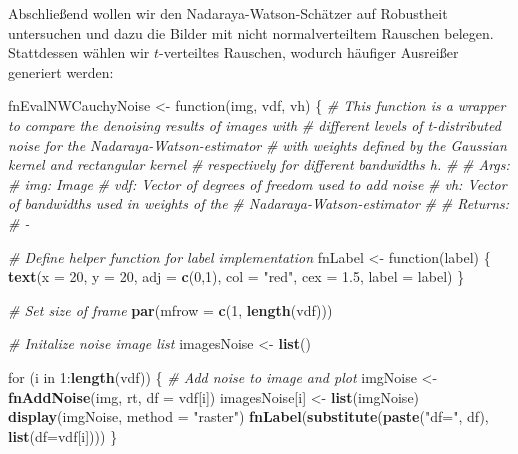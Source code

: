 \documentclass[10pt,]{article}
\newenvironment{Shaded}{\begin{snugshade}}{\end{snugshade}}
\newcommand{\KeywordTok}[1]{\textcolor[rgb]{0.13,0.29,0.53}{\textbf{{#1}}}}
\newcommand{\DataTypeTok}[1]{\textcolor[rgb]{0.13,0.29,0.53}{{#1}}}
\newcommand{\DecValTok}[1]{\textcolor[rgb]{0.00,0.00,0.81}{{#1}}}
\newcommand{\FloatTok}[1]{\textcolor[rgb]{0.00,0.00,0.81}{{#1}}}
\newcommand{\StringTok}[1]{\textcolor[rgb]{0.31,0.60,0.02}{{#1}}}
\newcommand{\CommentTok}[1]{\textcolor[rgb]{0.56,0.35,0.01}{\textit{{#1}}}}
\newcommand{\NormalTok}[1]{{#1}}
\begin{document}
Abschließend wollen wir den Nadaraya-Watson-Schätzer auf Robustheit
untersuchen und dazu die Bilder mit nicht normalverteiltem Rauschen
belegen. Stattdessen wählen wir \(t\)-verteiltes Rauschen, wodurch
häufiger Ausreißer generiert werden:

\begin{Shaded}
\begin{Highlighting}[]
\NormalTok{fnEvalNWCauchyNoise <-}\StringTok{ }\NormalTok{function(img, vdf, vh) \{}
  \CommentTok{# This function is a wrapper to compare the denoising results of images with }
  \CommentTok{# different levels of t-distributed noise for the Nadaraya-Watson-estimator }
  \CommentTok{# with weights defined by the Gaussian kernel and rectangular kernel}
  \CommentTok{# respectively for different bandwidths h.}
  \CommentTok{# }
  \CommentTok{# Args:}
  \CommentTok{#   img:  Image}
  \CommentTok{#   vdf:  Vector of degrees of freedom used to add noise}
  \CommentTok{#   vh:   Vector of bandwidths used in weights of the}
  \CommentTok{#         Nadaraya-Watson-estimator}
  \CommentTok{#   }
  \CommentTok{# Returns:}
  \CommentTok{#   -}
  
  \CommentTok{# Define helper function for label implementation}
  \NormalTok{fnLabel <-}\StringTok{ }\NormalTok{function(label) \{}
    \KeywordTok{text}\NormalTok{(}\DataTypeTok{x =} \DecValTok{20}\NormalTok{, }\DataTypeTok{y =} \DecValTok{20}\NormalTok{, }\DataTypeTok{adj =} \KeywordTok{c}\NormalTok{(}\DecValTok{0}\NormalTok{,}\DecValTok{1}\NormalTok{), }\DataTypeTok{col =} \StringTok{"red"}\NormalTok{, }\DataTypeTok{cex =} \FloatTok{1.5}\NormalTok{, }\DataTypeTok{label =} \NormalTok{label)}
  \NormalTok{\}}
  
  \CommentTok{# Set size of frame}
  \KeywordTok{par}\NormalTok{(}\DataTypeTok{mfrow =} \KeywordTok{c}\NormalTok{(}\DecValTok{1}\NormalTok{, }\KeywordTok{length}\NormalTok{(vdf)))}
  
  \CommentTok{# Initalize noise image list}
  \NormalTok{imagesNoise <-}\StringTok{ }\KeywordTok{list}\NormalTok{()}
  
  \NormalTok{for (i in }\DecValTok{1}\NormalTok{:}\KeywordTok{length}\NormalTok{(vdf)) \{}
    \CommentTok{# Add noise to image and plot}
    \NormalTok{imgNoise <-}\StringTok{ }\KeywordTok{fnAddNoise}\NormalTok{(img, rt, }\DataTypeTok{df =} \NormalTok{vdf[i])}
    \NormalTok{imagesNoise[i] <-}\StringTok{ }\KeywordTok{list}\NormalTok{(imgNoise)}
    \KeywordTok{display}\NormalTok{(imgNoise, }\DataTypeTok{method =} \StringTok{"raster"}\NormalTok{)}
    \KeywordTok{fnLabel}\NormalTok{(}\KeywordTok{substitute}\NormalTok{(}\KeywordTok{paste}\NormalTok{(}\StringTok{"df="}\NormalTok{, df), }\KeywordTok{list}\NormalTok{(}\DataTypeTok{df=}\NormalTok{vdf[i])))}
  \NormalTok{\}}
  

\end{Highlighting}
\end{Shaded}
\end{document}
